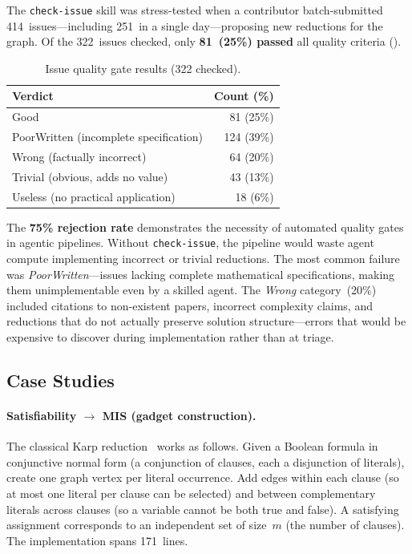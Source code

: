 \documentclass[conference]{IEEEtran}
\begin{document}
The \texttt{check-issue} skill was stress-tested when a contributor batch-submitted 414~issues---including 251~in a single day---proposing new reductions for the graph.
Of the 322~issues checked, only \textbf{81~(25\%) passed} all quality criteria ().

\begin{table}[t]
\caption{Issue quality gate results (322 checked).}\label{tab:quality-gate}
\centering
\small
\begin{tabular}{@{}lr@{}}
\toprule
Verdict & Count (\%) \\
\midrule
Good & 81 (25\%) \\
PoorWritten (incomplete specification) & 124 (39\%) \\
Wrong (factually incorrect) & 64 (20\%) \\
Trivial (obvious, adds no value) & 43 (13\%) \\
Useless (no practical application) & 18 (6\%) \\
\bottomrule
\end{tabular}
\end{table}

The \textbf{75\% rejection rate} demonstrates the necessity of automated quality gates in agentic pipelines.
Without \texttt{check-issue}, the pipeline would waste agent compute implementing incorrect or trivial reductions.
The most common failure was \emph{PoorWritten}---issues lacking complete mathematical specifications, making them unimplementable even by a skilled agent.
The \emph{Wrong} category~(20\%) included citations to non-existent papers, incorrect complexity claims, and reductions that do not actually preserve solution structure---errors that would be expensive to discover during implementation rather than at triage.

\subsection{Case Studies}\label{sec:cases}

\paragraph{Satisfiability $\to$ MIS (gadget construction).}
The classical Karp reduction~\cite{karp1972} works as follows.
Given a Boolean formula in conjunctive normal form (a conjunction of clauses, each a disjunction of literals), create one graph vertex per literal occurrence.
Add edges within each clause (so at most one literal per clause can be selected) and between complementary literals across clauses (so a variable cannot be both true and false).
A satisfying assignment corresponds to an independent set of size~$m$ (the number of clauses).
The implementation spans 171~lines.
\end{document}
